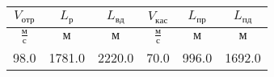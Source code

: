 \begin{tabular}{|c|c|c|c|c|c|}
\hline
$V_{отр}$ & $L_{р}$ & $L_{вд}$ & $V_{кас}$ & $L_{пр}$ & $L_{пд}$ \\ 
\hline
$\frac{м}{с}$ & $м$ & $м$ & $\frac{м}{с}$ & $м$ & $м$ \\ 
\hline
98.0 & 1781.0 & 2220.0 & 70.0 & 996.0 & 1692.0 \\ 
\hline
\end{tabular}